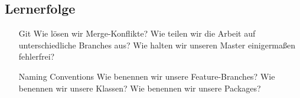 	\subsection{Lernerfolge}

	\begin{itemize}
		\item[Git] Wie lösen wir Merge-Konflikte? Wie teilen wir die Arbeit auf unterschiedliche Branches aus? Wie halten wir unseren Master einigermaßen fehlerfrei?
		\item[Naming Conventions] Wie benennen wir unsere Feature-Branches? Wie benennen wir unsere Klassen? Wie benennen wir unsere Packages?
	\end{itemize}